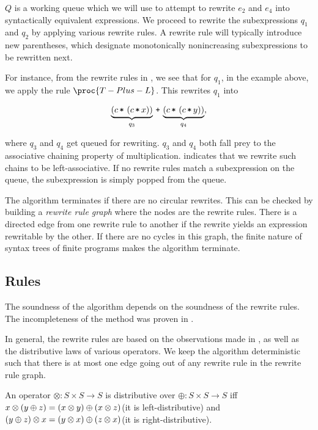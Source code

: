 $Q$ is a working queue which we will use to attempt to rewrite $e_2$ and $e_4$
into syntactically equivalent expressions. We proceed to rewrite the
subexpressions $q_1$ and $q_2$ by applying various rewrite rules. A rewrite
rule will typically introduce new parentheses, which designate monotonically
nonincreasing subexpressions to be rewritten next.

For instance, from the rewrite rules in , we see that
for $q_1$, in the example above, we apply the rule $\proc{T-Plus-L}$. This
rewrites $q_1$ into

\[\underbrace{\p{c \lt \p{c \lt x}}}_{q_3} \lp \underbrace{\p{c \lt \p{c \lt
y}}}_{q_4},\]

where $q_3$ and $q_4$ get queued for rewriting. $q_3$ and $q_4$ both fall prey
to the associative chaining property of multiplication.
 indicates that we rewrite such chains to be
left-associative. If no rewrite rules match a subexpression on the queue, the
subexpression is simply popped from the queue.

The algorithm terminates if there are no circular rewrites. This can be checked
by building a \emph{rewrite rule graph} where the nodes are the rewrite rules.
There is a directed edge from one rewrite rule to another if the rewrite yields
an expression rewritable by the other. If there are no cycles in this graph,
the finite nature of syntax trees of finite programs makes the algorithm
terminate.

\subsection{Rules}

The soundness of the algorithm depends on the soundness of the rewrite rules.
The incompleteness of the method was proven in . 

In general, the rewrite rules are based on the observations made in
, as well as the distributive laws of various
operators. We keep the algorithm deterministic such that there is at most one
edge going out of any rewrite rule in the rewrite rule graph.

An operator $\otimes:S\times S\rightarrow S$ is distributive over
$\oplus:S\times S \rightarrow S$ iff $x \otimes \left({ y \oplus z }\right) = \left({x \otimes
y}\right) \oplus \left({x \otimes z}\right)$(it is left-distributive) and $\left({y \oplus z}\right) \otimes
x = \left({y \otimes x}\right) \oplus \left({z \otimes x}\right)$(it is right-distributive).


